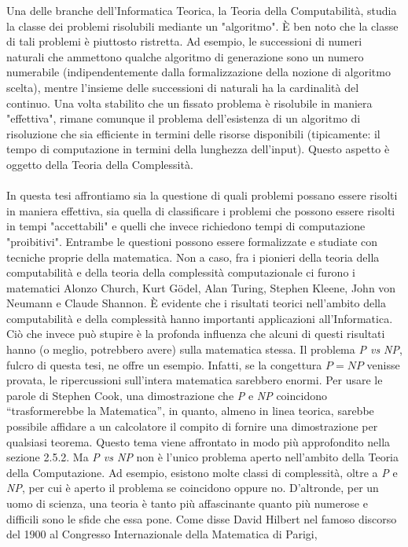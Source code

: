 \documentclass[12pt,a4paper]{report}
\theoremstyle{definition}
\begin{document}


Una delle branche dell’Informatica Teorica, la Teoria della Computabilità, studia la classe dei problemi risolubili mediante un "algoritmo". È ben noto che la classe di tali problemi è piuttosto ristretta. Ad esempio, le successioni di numeri naturali che ammettono qualche algoritmo di generazione sono un numero numerabile (indipendentemente dalla formalizzazione della nozione di algoritmo scelta), mentre l’insieme delle successioni di naturali ha la cardinalità del continuo. Una volta stabilito che un fissato problema è risolubile in maniera "effettiva", rimane comunque il problema dell’esistenza di un algoritmo di risoluzione  che sia efficiente in termini delle risorse disponibili (tipicamente: il tempo di computazione in termini della lunghezza dell’input). Questo aspetto è oggetto della Teoria della Complessità.\\
\\
In questa tesi affrontiamo sia la questione di quali problemi possano
essere risolti in maniera effettiva, sia quella di classificare i problemi che possono essere risolti in tempi "accettabili" e quelli che invece richiedono tempi di computazione "proibitivi". Entrambe le questioni possono essere formalizzate e studiate con tecniche proprie della matematica. Non a caso, fra i pionieri della teoria della computabilità e della teoria della complessità computazionale ci furono i matematici Alonzo Church, Kurt Gödel, Alan Turing, Stephen Kleene, John von Neumann e Claude Shannon. È evidente che i risultati teorici nell'ambito della computabilità e della complessità hanno importanti applicazioni all'Informatica. Ciò che invece può stupire è la profonda influenza che alcuni di questi risultati hanno (o meglio, potrebbero avere) sulla matematica stessa. Il problema \emph{P vs NP}, fulcro di questa tesi, ne offre un esempio. Infatti, se la
congettura $P=NP$ venisse provata, le ripercussioni sull'intera matematica sarebbero enormi. Per usare le parole di Stephen Cook, una dimostrazione che \emph{P} e \emph{NP} coincidono ``trasformerebbe la Matematica'', in quanto, almeno in linea teorica, sarebbe possibile affidare a un calcolatore il compito di fornire una dimostrazione per qualsiasi teorema. Questo tema viene affrontato in modo più approfondito nella sezione 2.5.2. Ma \emph{P vs NP} non è l'unico problema aperto nell'ambito della Teoria della Computazione. Ad esempio, esistono molte classi di complessità, oltre a \emph{P} e \emph{NP}, per cui è aperto il problema se coincidono oppure no. D'altronde, per un uomo di scienza, una teoria è tanto più affascinante quanto più numerose e difficili sono le sfide che essa pone. Come disse David Hilbert nel famoso discorso del 1900 al Congresso Internazionale della Matematica di Parigi,
\end{document}

